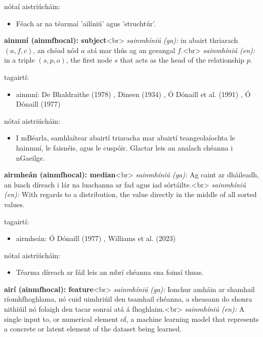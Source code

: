 \documentclass{article}
\begin{document}
nótaí aistriúcháin:
\begin{itemize}
	\item Féach ar na téarmaí 'ailíniú' agus 'struchtúr'.
\end{itemize}


\textbf{ainmní (ainmfhocal): subject}<br>
\textit{sainmhíniú (ga):} in abairt thriarach $(a,f,c)$, an chéad nód $a$ atá mar thús ag an gceangal $f$.<br>
\textit{sainmhíniú (en):} in a triple $(s,p,o)$, the first node $s$ that acts as the head of the relationship $p$.

tagairtí:
\begin{itemize}
	\item ainmní: De Bhaldraithe (1978) \cite{de-bhaldraithe}, Dineen (1934) \cite{dineen}, Ó Dónaill et al. (1991) \cite{focloir-beag}, Ó Dónaill (1977) \cite{odonaill}
\end{itemize}

nótaí aistriúcháin:
\begin{itemize}
	\item I mBéarla, samhlaítear abairtí triaracha mar abairtí teangeolaíochta le hainmní, le faisnéis, agus le cuspóir. Glactar leis an analach chéanna i nGaeilge.
\end{itemize}


\textbf{airmheán (ainmfhocal): median}<br>
\textit{sainmhíniú (ga):} Ag caint ar dháileadh, an luach díreach i lár na luachanna ar fad agus iad sórtáilte.<br>
\textit{sainmhíniú (en):} With regards to a distribution, the value directly in the middle of all sorted values.

tagairtí:
\begin{itemize}
	\item airmheán: Ó Dónaill (1977) \cite{odonaill}, Williams et al. (2023) \cite{storchiste}
\end{itemize}

nótaí aistriúcháin:
\begin{itemize}
	\item Téarma díreach ar fáil leis an mbrí chéanna sna foinsí thuas.
\end{itemize}


\textbf{airí (ainmfhocal): feature}<br>
\textit{sainmhíniú (ga):} Ionchur amháin ar shamhail ríomhfhoghlama, nó cuid uimhriúil den tsamhail chéanna, a sheasann do shonra nithiúil nó folaigh den tacar sonraí atá á fhoghlaim.<br>
\textit{sainmhíniú (en):} A single input to, or numerical element of, a machine learning model that represents a concrete or latent element of the dataset being learned.
\end{document}
